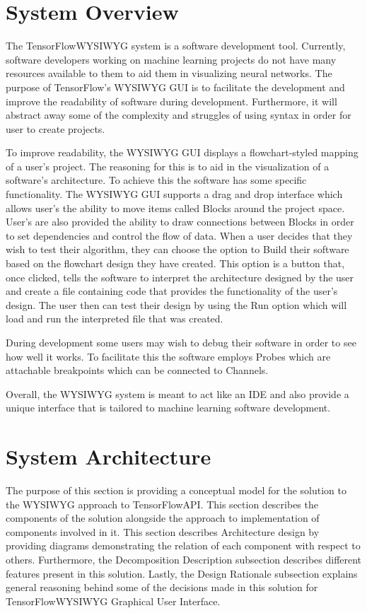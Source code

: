 \documentclass[journal,10pt,onecolumn,compsoc]{IEEEtran} \usepackage[margin=1.0in]{geometry} \usepackage{pdfpages}
\begin{document}
\section{System Overview}
The TensorFlow\texttrademark WYSIWYG system is a software development tool. 
Currently, software developers working on machine learning projects do not have many resources available to them to aid them in visualizing neural networks.
The purpose of TensorFlow's WYSIWYG GUI is to facilitate the development and improve the readability of software during development.
Furthermore, it will abstract away some of the complexity and struggles of using syntax in order for user to create projects.

\noindent To improve readability, the WYSIWYG GUI displays a flowchart-styled mapping of a user's project.
The reasoning for this is to aid in the visualization of a software's architecture.
To achieve this the software has some specific functionality.
The WYSIWYG GUI supports a drag and drop interface which allows user's the ability to move items called Blocks around the project space.
User's are also provided the ability to draw connections between Blocks in order to set dependencies and control the flow of data.
When a user decides that they wish to test their algorithm, they can choose the option to Build their software based on the flowchart design they have created.
This option is a button that, once clicked, tells the software to interpret the architecture designed by the user and create a file containing code that provides the functionality of the user's design.
The user then can test their design by using the Run option which will load and run the interpreted file that was created.

\noindent During development some users may wish to debug their software in order to see how well it works. 
To facilitate this the software employs Probes which are attachable breakpoints which can be connected to Channels. 

\noindent Overall, the WYSIWYG system is meant to act like an IDE and also provide a unique interface that is tailored to machine learning software development.
\newpage
\section{System Architecture}
\noindent The purpose of this section is providing a conceptual model for the solution to the WYSIWYG approach to TensorFlow\texttrademark API. This section describes the components of the solution alongside the approach to implementation of components involved in it. 
This section describes Architecture design by providing diagrams demonstrating the relation of each component with respect to others. 
Furthermore, the Decomposition Description subsection describes different features present in this solution. 
Lastly, the Design Rationale subsection explains general reasoning behind some of the decisions made in this solution for TensorFlow\texttrademark WYSIWYG Graphical User Interface.
\end{document}
